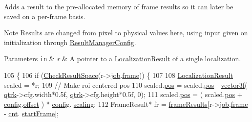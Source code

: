 Adds a result to the pre-\/allocated memory of frame results so it can later be saved on a per-\/frame basis.

\begin{DoxyNote}{Note}
Results are changed from pixel to physical values here, using input given on initialization through \hyperlink{struct_result_manager_config}{Result\+Manager\+Config}. 
\end{DoxyNote}

\begin{DoxyParams}[1]{Parameters}
\mbox{\tt in}  & {\em r} & A pointer to a \hyperlink{struct_localization_result}{Localization\+Result} of a single localization. \\
\hline
\end{DoxyParams}

\begin{DoxyCode}
105 \{
106     \textcolor{keywordflow}{if} (\hyperlink{class_result_manager_ad274290b02aabcaae7cb1052f8aaad14}{CheckResultSpace}(r->\hyperlink{struct_localization_result_a9a6b25c5cc92fe13bae3d0a5d37360f3}{job}.\hyperlink{struct_localization_job_a54df1ba33ab48b20dca664142a8cf619}{frame})) \{
107 
108         \hyperlink{struct_localization_result}{LocalizationResult} scaled = *r;
109         \textcolor{comment}{// Make roi-centered pos}
110         scaled.\hyperlink{struct_localization_result_a546f66485662c35bc75121513b6d1a60}{pos} = scaled.\hyperlink{struct_localization_result_a546f66485662c35bc75121513b6d1a60}{pos} - \hyperlink{std__incl_8h_a2feaef1d85a74bd5cf80df91b1a9a914}{vector3f}( \hyperlink{namespaceqtrk}{qtrk}->cfg.width*0.5f, 
      \hyperlink{namespaceqtrk}{qtrk}->cfg.height*0.5f, 0);
111         scaled.\hyperlink{struct_localization_result_a546f66485662c35bc75121513b6d1a60}{pos} = ( scaled.\hyperlink{struct_localization_result_a546f66485662c35bc75121513b6d1a60}{pos} + \hyperlink{class_result_manager_a23c07e2966ffb6b48c5c043418b4c748}{config}.\hyperlink{struct_result_manager_config_ac7b28e680c90bc2a882a6e064d919a40}{offset} ) * \hyperlink{class_result_manager_a23c07e2966ffb6b48c5c043418b4c748}{config}.
      \hyperlink{struct_result_manager_config_abb553f047043e2bd16b27ba6221f358e}{scaling};
112         FrameResult* fr = \hyperlink{class_result_manager_a2b7ba6801c7d9cfff0b4f8ee5ffc7569}{frameResults}[r->\hyperlink{struct_localization_result_a9a6b25c5cc92fe13bae3d0a5d37360f3}{job}.\hyperlink{struct_localization_job_a54df1ba33ab48b20dca664142a8cf619}{frame} - \hyperlink{class_result_manager_ad5f8491ff6c6f2e1e78f04c537c9474d}{cnt}.
      \hyperlink{struct_result_manager_1_1_frame_counters_a91cdacd9e2418fc49cdebabc171a1aa6}{startFrame}];

\end{DoxyCode}
